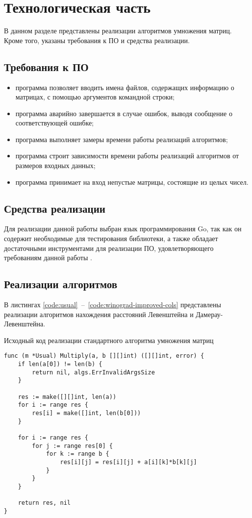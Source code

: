 \chapter{Технологическая часть}

В данном разделе представлены реализации алгоритмов умножения матриц. Кроме того, указаны требования к ПО и средства реализации.

\section{Требования к ПО}
\begin{itemize}
	\item программа позволяет вводить имена файлов, содержащих информацию о матрицах, с помощью аргументов командной строки;
	\item программа аварийно завершается в случае ошибок, выводя сообщение о соответствующей ошибке;
	\item программа выполняет замеры времени работы реализаций алгоритмов;
	\item программа строит зависимости времени работы реализаций алгоритмов от размеров входных данных;
	\item программа принимает на вход непустые матрицы, состоящие из целых чисел.
\end{itemize}

\section{Средства реализации}
Для реализации данной работы выбран язык программирования Go, так как он содержит необходимые для тестирования библиотеки, а также обладает достаточными инструментами для реализации ПО, удовлетворяющего требованиям данной работы \cite{bib:3}.

\section{Реализации алгоритмов}
В листингах \ref{code:usual}~--~\ref{code:winograd-improved-cols} представлены реализации алгоритмов нахождения расстояний Левенштейна и Дамерау-Левенштейна.

\newpage

\begin{code}
\caption{Исходный код реализации стандартного алгоритма умножения матриц}
\label{code:usual}
\begin{verbatim}
func (m *Usual) Multiply(a, b [][]int) ([][]int, error) {
	if len(a[0]) != len(b) {
		return nil, algs.ErrInvalidArgsSize
	}

	res := make([][]int, len(a))
	for i := range res {
		res[i] = make([]int, len(b[0]))
	}

	for i := range res {
		for j := range res[0] {
			for k := range b {
				res[i][j] = res[i][j] + a[i][k]*b[k][j]
			}
		}
	}

	return res, nil
}
\end{verbatim}
\end{code}

